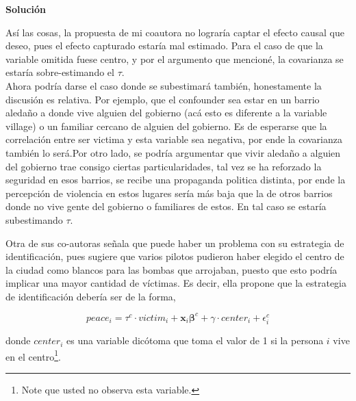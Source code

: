 \documentclass[a4paper, answers, addpoints, 11pt]{exam}
\newenvironment{solucion}{%
  \begin{mdframed}[
    backgroundcolor=blue!5,    %
    linecolor=blue!50,          %
    linewidth=2pt,              %
    leftmargin=10pt,            %
    rightmargin=8pt,           %
    topline=true,              %
    bottomline=true,            %
    roundcorner=10pt,           %
    innerleftmargin=10pt,       %
    innerrightmargin=10pt,      %
    innerbottommargin=10pt,     %
    innertopmargin=10pt         %
  ]%
  \begin{tcolorbox}[colframe=blue!50!black, colback=blue!50, coltitle=white, sharp corners=all, boxrule=1mm, width=\textwidth, halign=left, valign=center, top=0mm, bottom=0mm, left=0mm, right=0mm] \textbf{Solución} \end{tcolorbox} }{\end{mdframed}}
\begin{document}
\begin{enumerate}
\begin{solucion}
        Así las cosas, la propuesta de mi coautora no lograría captar el efecto causal que deseo, pues el efecto capturado estaría mal estimado. Para el caso de que la variable omitida fuese centro, y por el argumento que mencioné, la covarianza se estaría sobre-estimando el $\tau$.\\
        
        Ahora podría darse el caso donde se subestimará también, honestamente la discusión es relativa. Por ejemplo, que el confounder sea estar en un barrio aledaño a donde vive alguien del gobierno (acá esto es diferente a la variable village) o un familiar cercano de alguien del gobierno. Es de esperarse que la correlación entre ser victima y esta variable sea negativa, por ende la covarianza también lo será.Por otro lado, se podría argumentar que vivir aledaño a alguien del gobierno trae consigo ciertas particularidades, tal vez se ha reforzado la seguridad en esos barrios, se recibe una propaganda politica distinta, por ende la percepción de violencia en estos lugares sería más baja que la de otros barrios donde no vive gente del gobierno o familiares de estos. En tal caso se estaría subestimando $\tau$.
        \end{solucion}

    
\end{enumerate}

    Otra de sus co-autoras señala que puede haber un problema con su estrategia de identificación, pues sugiere que varios pilotos pudieron haber elegido el centro de la ciudad como blancos para las bombas que arrojaban, puesto que esto podría implicar una mayor cantidad de víctimas. Es decir, ella propone que la estrategia de identificación debería ser de la forma,

    \begin{equation}\label{eq:center}
        peace_i = \tau^{c} \cdot victim_i + \textbf{x}_i\boldsymbol\beta^{c} + \gamma \cdot center_i + \epsilon^{c}_i
    \end{equation}

    donde $center_i$ es una variable dicótoma que toma el valor de 1 si la persona $i$ vive en el centro\footnote{Note que usted no observa esta variable.}. 
\end{document}
